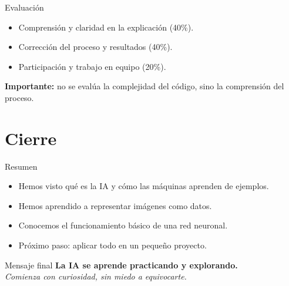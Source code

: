 \documentclass[10pt,aspectratio=169]{beamer}
\begin{document}
\begin{frame}{Evaluación}
  \begin{itemize}
    \item Comprensión y claridad en la explicación (40\%).
    \item Corrección del proceso y resultados (40\%).
    \item Participación y trabajo en equipo (20\%).
  \end{itemize}
  \vspace{0.5em}
  \textbf{Importante:} no se evalúa la complejidad del código, sino la comprensión del proceso.
\end{frame}

\section{Cierre}

\begin{frame}{Resumen}
  \begin{itemize}
    \item Hemos visto qué es la IA y cómo las máquinas aprenden de ejemplos.
    \item Hemos aprendido a representar imágenes como datos.
    \item Conocemos el funcionamiento básico de una red neuronal.
    \item Próximo paso: aplicar todo en un pequeño proyecto.
  \end{itemize}
\end{frame}

\begin{frame}{Mensaje final}
  \centering
  \Large\textbf{La IA se aprende practicando y explorando.}\\[6pt]
  \normalsize\textit{Comienza con curiosidad, sin miedo a equivocarte.}
\end{frame}
\end{document}
